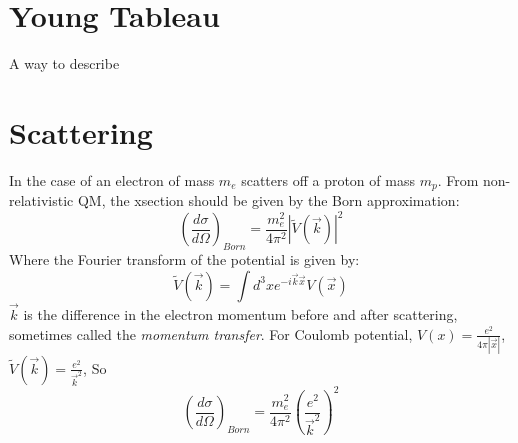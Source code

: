 \section{Young Tableau}
A way to describe 

\section{Scattering}
In the case of an electron of mass $m_e$ scatters off a proton of mass $m_p$. 
From non-relativistic QM, the xsection should be given by the Born approximation:
\begin{equation}
    \left(\frac{d\sigma}{d\Omega}\right)_{Born} = \frac{m_e^2}{4\pi^2}|\tilde{V}(\vec{k})|^2
\end{equation}
Where the Fourier transform of the potential is given by:
\[
    \tilde{V}(\vec{k}) = \int d^3xe^{-i\vec{k}\vec{x}}V(\vec{x})
    \]
$\vec{k}$ is the difference in the electron momentum before and after scattering, 
sometimes called the \emph{momentum transfer}. For Coulomb potential, 
$V(x) = \frac{e^2}{4\pi|\vec{x}|}$, $\tilde{V}(\vec{k}) = \frac{e^2}{\vec{k}^2}$, 
So
\[
    \left(\frac{d\sigma}{d\Omega}\right)_{Born} = \frac{m_e^2}{4\pi^2}\left(\frac{e^2}{\vec{k}^2}\right)^2
    \]
